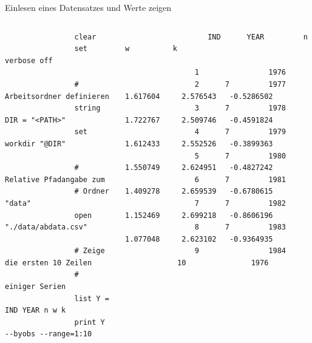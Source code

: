 \documentclass{beamer}[11pt]
\begin{document}
\begin{frame}[fragile]{Einlesen eines Datensatzes und Werte zeigen}
	\begin{columns}[T] %
		\scriptsize
		\begin{column}{.45\textwidth}
			\begin{verbatim}
				clear
				set verbose off

				# Arbeitsordner definieren
				string DIR = "<PATH>"
				set workdir "@DIR"

				# Relative Pfadangabe zum
				# Ordner "data"
				open "./data/abdata.csv"

				# Zeige die ersten 10 Zeilen
				# einiger Serien
				list Y = IND YEAR n w k
				print Y --byobs --range=1:10
			\end{verbatim}
		\end{column}

		\begin{column}{.55\textwidth}
			\tiny
			\begin{verbatim}
			       IND      YEAR         n            w          k

				1                1976
				2      7         1977     1.617604     2.576543   -0.5286502
				3      7         1978     1.722767     2.509746   -0.4591824
				4      7         1979     1.612433     2.552526   -0.3899363
				5      7         1980     1.550749     2.624951   -0.4827242
				6      7         1981     1.409278     2.659539   -0.6780615
				7      7         1982     1.152469     2.699218   -0.8606196
				8      7         1983     1.077048     2.623102   -0.9364935
				9                1984
			10               1976
			\end{verbatim}
	  \end{column}
	\end{columns}
\end{frame}
\end{document}
